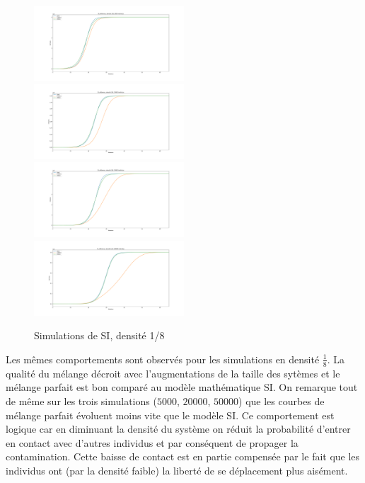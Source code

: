 \begin{figure}
    \centering
    \captionsetup{justification=centering}
    \includegraphics[width=0.5\textwidth]{Images/SI_ref_8_5k.pdf}
    \includegraphics[width=0.5\textwidth]{Images/SI_ref_8_20k.pdf}
    \includegraphics[width=0.5\textwidth]{Images/SI_ref_8_50k.pdf}
    \includegraphics[width=0.5\textwidth]{Images/SI_ref_8_100k.pdf}
    \caption{Simulations de SI, densité 1/8}
\end{figure}

Les mêmes comportements sont observés pour les simulations en densité $\frac{1}{8}$. La qualité du mélange décroit avec l'augmentations de la taille des sytèmes et le mélange parfait est bon comparé au modèle mathématique SI. On remarque tout de même sur les trois simulations ($5000$, $20000$, $50000$) que les courbes de mélange parfait évoluent moins vite que le modèle SI. Ce comportement est logique car en diminuant la densité du système on réduit la probabilité d'entrer en contact avec d'autres individus et par conséquent de propager la contamination. Cette baisse de contact est en partie compensée par le fait que les individus ont (par la densité faible) la liberté de se déplacement plus aisément.\\

